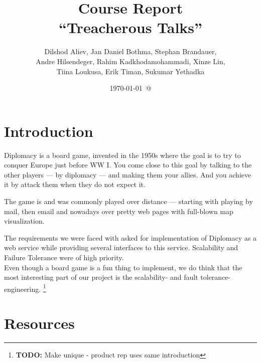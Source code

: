 \documentclass[11pt,a4paper]{report}
\newcommand{\todo}[1]{\footnote{{\color{red} {\bf TODO:} #1}}}
\begin{document}
\title{Course Report \\
  ``Treacherous Talks''}
\date{\today\ @ \currenttime}
\author{Dilshod Aliev, Jan Daniel Bothma, Stephan Brandauer,\\
 Andre Hilsendeger, Rahim Kadkhodamohammadi, Xinze Lin,\\
Tiina Loukusa, Erik Timan, Sukumar Yethadka}
\maketitle
\tableofcontents

\chapter{Introduction}
Diplomacy is a board game, invented in the 1950s where the goal is to try to
conquer Europe just before WW I. You come close to this goal by talking to the
other players --- by diplomacy --- and making them your allies. And you achieve
it by attack them when they do not expect it.

The game is and was commonly played over distance --- starting with playing by
mail, then email and nowadays over pretty web pages with full-blown map
visualization.

The requirements we were faced with asked for implementation of Diplomacy as a
web service while providing several interfaces to this service. Scalability and
Failure Tolerance were of high priority. \\
Even though a board game is a fun thing to implement, we do think that the most
interesting part of our project is the scalability- and fault tolerance-
engineering.
\todo{Make unique - product rep uses same introduction}

\chapter{Resources}
\end{document}
